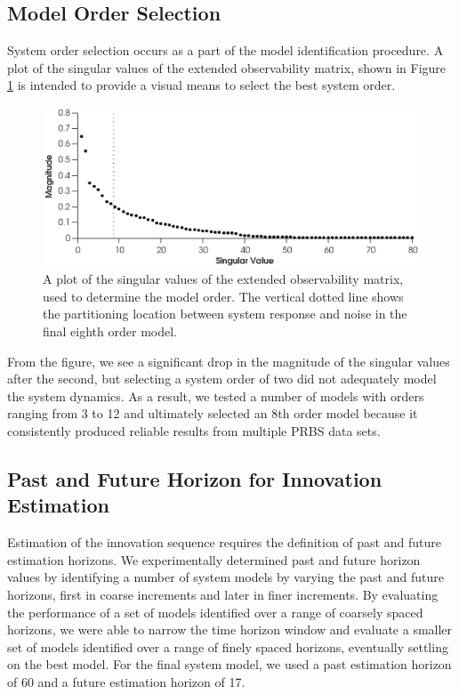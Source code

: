 \subsection{Model Order Selection}
System order selection occurs as a part of the model identification procedure. A plot of the singular values of the extended observability matrix, shown in Figure \ref{singular_values} is intended to provide a visual means to select the best system order. 
\begin{figure}[b!]
	\centering
	\includegraphics{../fig/singular_values_parsim.eps}
	\caption{A plot of the singular values of the extended observability matrix, used to determine the model order. The vertical dotted line shows the partitioning location between system response and noise in the final eighth order model.}
	\label{singular_values}
\end{figure}
From the figure, we see a significant drop in the magnitude of the singular values after the second, but selecting a system order of two did not adequately model the system dynamics. As a result, we tested a number of models with orders ranging from 3 to 12 and ultimately selected an 8th order model because it consistently produced reliable results from multiple PRBS data sets.

\subsection{Past and Future Horizon for Innovation Estimation}
Estimation of the innovation sequence requires the definition of past and future estimation horizons. We experimentally determined past and future horizon values by identifying a number of system models by varying the past and future horizons, first in coarse increments and later in finer increments. By evaluating the performance of a set of models identified over a range of coarsely spaced horizons, we were able to narrow the time horizon window and evaluate a smaller set of models identified  over a range of finely spaced horizons, eventually settling on the best model. For the final system model, we used a past estimation horizon of 60 and a future estimation horizon of 17. 


